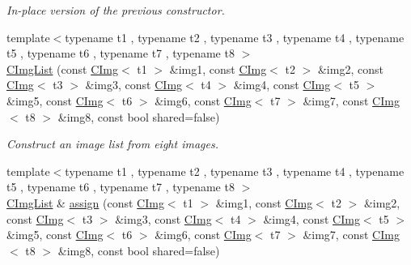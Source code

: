 \begin{DoxyCompactItemize}
\begin{DoxyCompactList}\small\item\em In-\/place version of the previous constructor. \end{DoxyCompactList}\item 
\hypertarget{structcimg__library_1_1_c_img_list_aa92fb9267760154a2de77e92de223348}{{\footnotesize template$<$typename t1 , typename t2 , typename t3 , typename t4 , typename t5 , typename t6 , typename t7 , typename t8 $>$ }\\\hyperlink{structcimg__library_1_1_c_img_list_aa92fb9267760154a2de77e92de223348}{C\-Img\-List} (const \hyperlink{structcimg__library_1_1_c_img}{C\-Img}$<$ t1 $>$ \&img1, const \hyperlink{structcimg__library_1_1_c_img}{C\-Img}$<$ t2 $>$ \&img2, const \hyperlink{structcimg__library_1_1_c_img}{C\-Img}$<$ t3 $>$ \&img3, const \hyperlink{structcimg__library_1_1_c_img}{C\-Img}$<$ t4 $>$ \&img4, const \hyperlink{structcimg__library_1_1_c_img}{C\-Img}$<$ t5 $>$ \&img5, const \hyperlink{structcimg__library_1_1_c_img}{C\-Img}$<$ t6 $>$ \&img6, const \hyperlink{structcimg__library_1_1_c_img}{C\-Img}$<$ t7 $>$ \&img7, const \hyperlink{structcimg__library_1_1_c_img}{C\-Img}$<$ t8 $>$ \&img8, const bool shared=false)}\label{structcimg__library_1_1_c_img_list_aa92fb9267760154a2de77e92de223348}

\begin{DoxyCompactList}\small\item\em Construct an image list from eight images. \end{DoxyCompactList}\item 
\hypertarget{structcimg__library_1_1_c_img_list_aeb44df42d051bc558283863990828882}{{\footnotesize template$<$typename t1 , typename t2 , typename t3 , typename t4 , typename t5 , typename t6 , typename t7 , typename t8 $>$ }\\\hyperlink{structcimg__library_1_1_c_img_list}{C\-Img\-List} \& \hyperlink{structcimg__library_1_1_c_img_list_aeb44df42d051bc558283863990828882}{assign} (const \hyperlink{structcimg__library_1_1_c_img}{C\-Img}$<$ t1 $>$ \&img1, const \hyperlink{structcimg__library_1_1_c_img}{C\-Img}$<$ t2 $>$ \&img2, const \hyperlink{structcimg__library_1_1_c_img}{C\-Img}$<$ t3 $>$ \&img3, const \hyperlink{structcimg__library_1_1_c_img}{C\-Img}$<$ t4 $>$ \&img4, const \hyperlink{structcimg__library_1_1_c_img}{C\-Img}$<$ t5 $>$ \&img5, const \hyperlink{structcimg__library_1_1_c_img}{C\-Img}$<$ t6 $>$ \&img6, const \hyperlink{structcimg__library_1_1_c_img}{C\-Img}$<$ t7 $>$ \&img7, const \hyperlink{structcimg__library_1_1_c_img}{C\-Img}$<$ t8 $>$ \&img8, const bool shared=false)}\label{structcimg__library_1_1_c_img_list_aeb44df42d051bc558283863990828882}


\end{DoxyCompactItemize}
